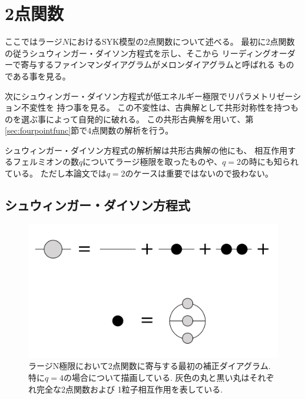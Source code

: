 \section{2点関数\label{sec:twopointfunc}}
ここではラージ$N$におけるSYK模型の2点関数について述べる。
最初に2点関数の従うシュウィンガー・ダイソン方程式を示し、そこから
リーディングオーダーで寄与するファインマンダイアグラムがメロンダイアグラムと呼ばれる
ものである事を見る。

次にシュウィンガー・ダイソン方程式が低エネルギー極限でリパラメトリゼーション不変性を
持つ事を見る。
この不変性は、古典解として共形対称性を持つものを選ぶ事によって自発的に破れる。
この共形古典解を用いて、第\ref{sec:fourpointfunc}節で4点関数の解析を行う。

シュウィンガー・ダイソン方程式の解析解は共形古典解の他にも、
相互作用するフェルミオンの数$q$についてラージ極限を取ったものや、$q=2$の時にも知られている。
ただし本論文では$q=2$のケースは重要ではないので扱わない。

\subsection{シュウィンガー・ダイソン方程式}
\begin{figure}[ht]
  \centering
  \includegraphics[width=14cm]{figures/melonDiagram}
  \caption{ラージN極限において2点関数に寄与する最初の補正ダイアグラム.
  特に$q=4$の場合について描画している. 灰色の丸と黒い丸はそれぞれ完全な2点関数および
  1粒子相互作用を表している.}
  \label{fig:melonDiagram}
\end{figure}

